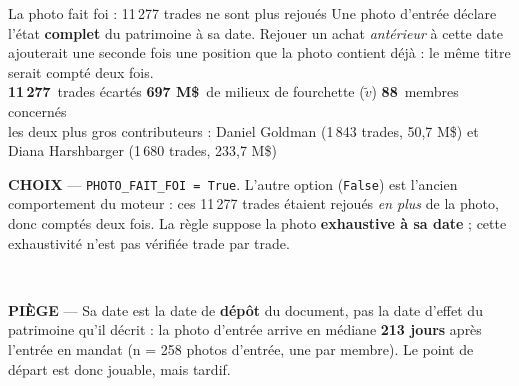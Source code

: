 \documentclass[11pt,aspectratio=169]{beamer}
\newcommand{\co}[1]{\texttt{#1}}
\newcommand{\kpi}[3]{{\large\textbf{\textcolor{#1}{#2}}}~{\footnotesize #3}}
\newcommand{\defl}[1]{{\scriptsize\color{black!55}#1}}
\newcommand{\choixbox}[1]{%
  \colorbox{alertred!8}{\parbox{\dimexpr\linewidth-8pt}{\scriptsize
    \textbf{\textcolor{alertred}{CHOIX}}\; --- #1}}}
\newcommand{\piege}[1]{%
  \colorbox{warnorange!12}{\parbox{\dimexpr\linewidth-8pt}{\scriptsize
    \textbf{\textcolor{warnorange}{PIÈGE}}\; --- #1}}}
\begin{document}
\begin{frame}{La photo fait foi : 11\,277 trades ne sont plus rejoués}
  \small
  Une photo d'entrée déclare l'état \textbf{complet} du patrimoine à sa date. Rejouer un achat
  \emph{antérieur} à cette date ajouterait une seconde fois une position que la photo contient
  déjà : le même titre serait compté deux fois.\\[2mm]
  \centering
  \kpi{alertred}{11\,277}{trades écartés} \quad
  \kpi{alertred}{697 M\$}{de milieux de fourchette ($\tilde v$)} \quad
  \kpi{alertred}{88}{membres concernés}\\[2mm]
  \defl{les deux plus gros contributeurs : Daniel Goldman (1\,843 trades, 50,7 M\$) et Diana
  Harshbarger (1\,680 trades, 233,7 M\$)}\\[3mm]
  \raggedright
  \choixbox{\co{PHOTO\_FAIT\_FOI = True}. L'autre option (\co{False}) est l'ancien comportement du
  moteur : ces 11\,277 trades étaient rejoués \emph{en plus} de la photo, donc comptés deux fois.
  La règle suppose la photo \textbf{exhaustive à sa date} ; cette exhaustivité n'est pas vérifiée
  trade par trade.}\\[1.5mm]
  \piege{\og{}Sa date\fg{} est la date de \textbf{dépôt} du document, pas la date d'effet du
  patrimoine qu'il décrit : la photo d'entrée arrive en médiane \textbf{213 jours} après l'entrée en
  mandat (n = 258 photos d'entrée, une par membre). Le point de départ est donc jouable, mais tardif.}
\end{frame}
\end{document}
